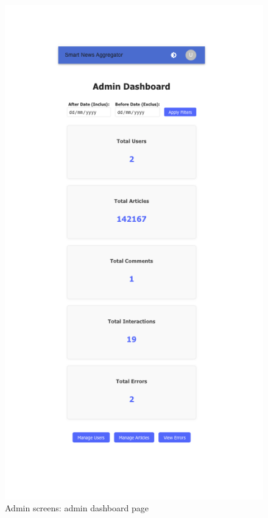 \begin{figure}[!h]
    \centering
    \begin{minipage}{0.48\linewidth}
        \centering
        \includegraphics[width=1\textwidth]{chapters/chapter_03/page/admin/admin-dashboard-page}
        \caption{Admin screens: admin dashboard page}
        \label{fig:admin-dashboard-wireframes}

\end{minipage}
\end{figure}
